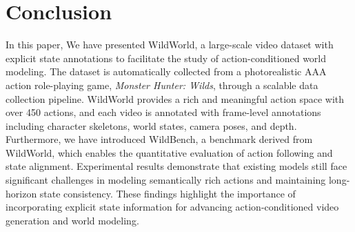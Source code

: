 \section{Conclusion}
In this paper, We have presented WildWorld, a large-scale video dataset with explicit state annotations to facilitate the study of action-conditioned world modeling.
The dataset is automatically collected from a photorealistic AAA action role-playing game, \textit{Monster Hunter: Wilds}, through a scalable data collection pipeline.
WildWorld provides a rich and meaningful action space with over 450 actions, and each video is annotated with frame-level annotations including character skeletons, world states, camera poses, and depth.
Furthermore, we have introduced WildBench, a benchmark derived from WildWorld, which enables the quantitative evaluation of action following and state alignment.
Experimental results demonstrate that existing models still face significant challenges in modeling semantically rich actions and maintaining long-horizon state consistency.
These findings highlight the importance of incorporating explicit state information for advancing action-conditioned video generation and world modeling.